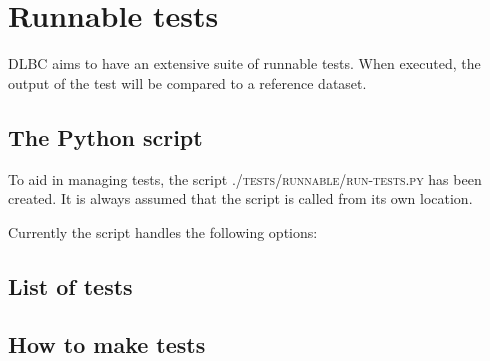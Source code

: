 \documentclass{article}
\begin{document}
\section{Runnable tests}

DLBC aims to have an extensive suite of runnable tests. When executed, the output of the test will be compared to a reference dataset.

\subsection{The Python script}

To aid in managing tests, the script \textsc{./tests/runnable/run-tests.py} has been created. It is always assumed that the script is called from its own location.

Currently the script handles the following options:



\subsection{List of tests}



\subsection{How to make tests}
\end{document}
